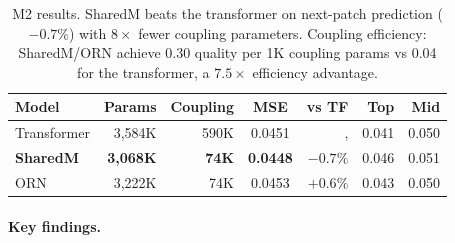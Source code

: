 \documentclass[11pt, a4paper]{article}
\theoremstyle{plain}
\theoremstyle{remark}
\begin{document}
\begin{table}[h]
\centering\small
\begin{tabular}{@{}lrrcrrr@{}}
\toprule
\textbf{Model} & \textbf{Params} & \textbf{Coupling} & \textbf{MSE} & \textbf{vs TF} & \textbf{Top} & \textbf{Mid} \\
\midrule
Transformer & 3,584K & 590K & 0.0451 & ,  & 0.041 & 0.050 \\
\textbf{SharedM} & \textbf{3,068K} & \textbf{74K} & \textbf{0.0448} & $\mathbf{-0.7\%}$ & 0.046 & 0.051 \\
ORN & 3,222K & 74K & 0.0453 & $+0.6\%$ & 0.043 & 0.050 \\
\bottomrule
\end{tabular}
\caption{M2 results. SharedM beats the transformer on next-patch prediction ($-0.7\%$) with $8\times$ fewer coupling parameters. Coupling efficiency: SharedM/ORN achieve 0.30 quality per 1K coupling params vs 0.04 for the transformer, a $7.5\times$ efficiency advantage.}
\end{table}

\paragraph{Key findings.}
\end{document}
